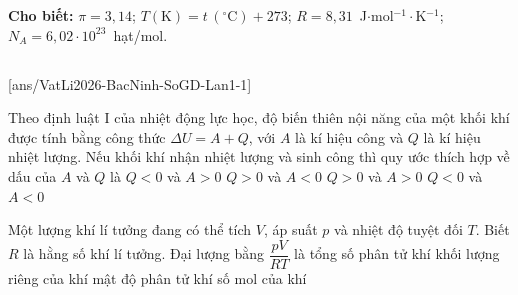 \def\CheDo{solcolor}%
\def\tenchuong{Sở GD\&ĐT Bắc Ninh -- Lần 1}
\def\thuonghieu{VẬT LÍ 12 -- Eduzy.com.vn}
\def\TachCauDS{1}
\def\TachCauLG{1}




	\noindent\textbf{Cho biết:} $\pi=3{,}14$; $T(\text{K})=t\,(^\circ\text{C})+273$; $R=8{,}31$~J$\cdot$mol$^{-1}\cdot$K$^{-1}$; $N_A=6{,}02\cdot 10^{23}$~hạt/mol.

	\noindent
	\subsection*{}
	\setcounter{ex}{0}
	[ans/VatLi2026-BacNinh-SoGD-Lan1-1]

	\begin{ex}%
		Theo định luật I của nhiệt động lực học, độ biến thiên nội năng của một khối khí được tính bằng công thức $\Delta U=A+Q$, với $A$ là kí hiệu công và $Q$ là kí hiệu nhiệt lượng. Nếu khối khí nhận nhiệt lượng và sinh công thì quy ước thích hợp về dấu của $A$ và $Q$ là
		\choice
		{$Q<0$ và $A>0$}
		{\True $Q>0$ và $A<0$}
		{$Q>0$ và $A>0$}
		{$Q<0$ và $A<0$}
	\end{ex}

	\begin{ex}%
		Một lượng khí lí tưởng đang có thể tích $V$, áp suất $p$ và nhiệt độ tuyệt đối $T$. Biết $R$ là hằng số khí lí tưởng. Đại lượng bằng $\dfrac{pV}{RT}$ là
		\choice
		{tổng số phân tử khí}
		{khối lượng riêng của khí}
		{mật độ phân tử khí}
		{\True số mol của khí}
	\end{ex}

